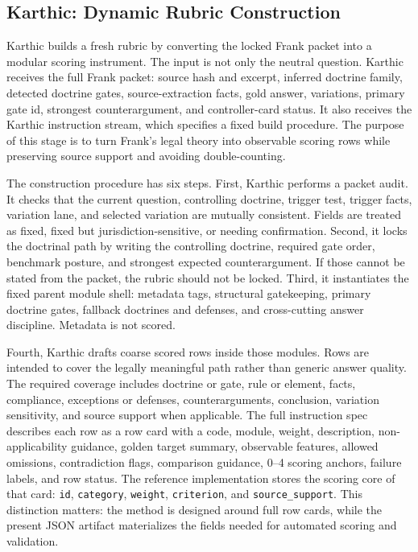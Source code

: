 \subsection{Karthic: Dynamic Rubric Construction}

Karthic builds a fresh rubric by converting the locked Frank packet into a
modular scoring instrument. The input is not only the neutral question. Karthic
receives the full Frank packet: source hash and excerpt, inferred doctrine
family, detected doctrine gates, source-extraction facts, gold answer,
variations, primary gate id, strongest counterargument, and controller-card
status. It also receives the Karthic instruction stream, which specifies a
fixed build procedure. The purpose of this stage is to turn Frank's legal theory
into observable scoring rows while preserving source support and avoiding
double-counting.

The construction procedure has six steps. First, Karthic performs a packet
audit. It checks that the current question, controlling doctrine, trigger test,
trigger facts, variation lane, and selected variation are mutually consistent.
Fields are treated as fixed, fixed but jurisdiction-sensitive, or needing
confirmation. Second, it locks the doctrinal path by writing the controlling
doctrine, required gate order, benchmark posture, and strongest expected
counterargument. If those cannot be stated from the packet, the rubric should
not be locked. Third, it instantiates the fixed parent module shell: metadata
tags, structural gatekeeping, primary doctrine gates, fallback doctrines and
defenses, and cross-cutting answer discipline. Metadata is not scored.

Fourth, Karthic drafts coarse scored rows inside those modules. Rows are
intended to cover the legally meaningful path rather than generic answer
quality. The required coverage includes doctrine or gate, rule or element,
facts, compliance, exceptions or defenses, counterarguments, conclusion,
variation sensitivity, and source support when applicable. The full instruction
spec describes each row as a row card with a code, module, weight, description,
non-applicability guidance, golden target summary, observable features,
allowed omissions, contradiction flags, comparison guidance, 0--4 scoring
anchors, failure labels, and row status. The reference implementation stores the
scoring core of that card: \texttt{id}, \texttt{category}, \texttt{weight},
\texttt{criterion}, and \texttt{source\_support}. This distinction matters:
the method is designed around full row cards, while the present JSON artifact
materializes the fields needed for automated scoring and validation.

